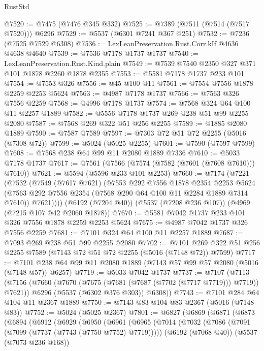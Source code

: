 \begin{lexlean}{RustStd}
\begin{coremodule}
@7520 := @7475 (@7476 @345 @332)
@7525 := @7389 (@7511 (@7514 (@7517 @7520))) @6296
@7529 := @5537 (@6301 @7241 @367 @251)
@7532 := @7236 (@7525 @7529 @6308)
@7536 := LexLeanPreservation.Rust.Corr.kIf @4636 @4638 @4640
@7539 := @7536 @7178 @1737 @1737
@7540 := LexLeanPreservation.Rust.Kind.plain
@7549 := @7539 @7540 @2350 @327 @371 @101 @1878 @2260 @1878 @2355
@7553 := @5581 @7178 @1737 @233 @101
@7554 := @7553 @326
@7556 := @45 @100 @11
@7561 := @7554 @7556 @1878 @2259 @2253 @5624
@7563 := @4987 @7178 @1737
@7566 := @7563 @326 @7556 @2259
@7568 := @4996 @7178 @1737
@7574 := @7568 @324 @64 @100 @11 @2257 @1889
@7582 := @5556 @7178 @1737 @269 @238 @51 @99 @2255 @2080
@7587 := @7568 @269 @322 @51 @256 @2255
@7589 := @1885 @2080 @1889
@7590 := @7587 @7589
@7597 := @7303 @72 @51 @72 @2255 (@5016 (@7308 @72))
@7599 := @5024 (@5025 @2255)
@7601 := @7590 (@7597 @7599)
@7608 := @7568 @238 @64 @99 @11 @2080 @1889 @7336
@7610 := @5033 @7178 @1737
@7617 := @7561 (@7566 (@7574 (@7582 (@7601 (@7608 @7610))) @7610))
@7621 := @5594 (@5596 @233 @101 @2253)
@7660 := @7174
    (@7221
      (@7532
        (@7549
          (@7617 @7621)
          (@7553
            @292
            @7556
            @1878
            @2354
            @2253
            @5624
            (@7563 @292 @7556 @2354 (@7568 @290 @64 @100 @11 @2284 @1889 @7314 @7610))
            @7621))))
    (@6192 (@7204 @40))
    (@5537 (@7208 @236 @107))
    (@4969 (@7215 @107 @42 @2060 @1878))
@7670 := @5581 @7042 @1737 @233 @101 @326 @7556 @1878 @2259 @2253 @5624
@7675 := @4987 @7042 @1737 @326 @7556 @2259
@7681 := @7101 @324 @64 @100 @11 @2257 @1889
@7687 := @7093 @269 @238 @51 @99 @2255 @2080
@7702 := @7101 @269 @322 @51 @256 @2255 @7589 (@7143 @72 @51 @72 @2255 (@5016 (@7148 @72)) @7599)
@7717 := @7101 @238 @64 @99 @11 @2080 @1889 (@7143 @57 @99 @57 @2080 (@5016 (@7148 @57)) @6257)
@7719 := @5033 @7042 @1737
@7737 := @7107
    (@7113
      (@7156
        (@7660 (@7670 (@7675 (@7681 (@7687 (@7702 (@7717 @7719))) @7719)) @7621))
        @6296
        (@5537 (@6302 @376 @303))
        @6308))
@7743 := @7101 @284 @64 @104 @11 @2367 @1889
@7750 := @7143 @83 @104 @83 @2367 (@5016 (@7148 @83))
@7752 := @5024 (@5025 @2367)
@7801 := @6827
    (@6869
      (@6871
        (@6873
          (@6894
            (@6912
              (@6929
                (@6950
                  (@6961
                    (@6965
                      (@7014
                        (@7032
                          (@7086 (@7091 (@7099 (@7737 (@7743 (@7750 @7752) @7719)))))
                          (@6192 (@7068 @40))
                          (@5537 (@7073 @236 @168))

\end{coremodule}
\end{lexlean}
